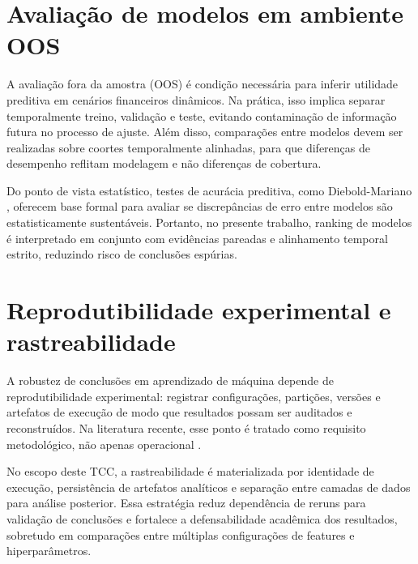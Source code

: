 \section{Avaliação de modelos em ambiente OOS}
A avaliação fora da amostra (OOS) é condição necessária para inferir utilidade preditiva em cenários financeiros dinâmicos. Na prática, isso implica separar temporalmente treino, validação e teste, evitando contaminação de informação futura no processo de ajuste. Além disso, comparações entre modelos devem ser realizadas sobre coortes temporalmente alinhadas, para que diferenças de desempenho reflitam modelagem e não diferenças de cobertura.

Do ponto de vista estatístico, testes de acurácia preditiva, como Diebold-Mariano \cite{DIEBOLDMARIANO1995}, oferecem base formal para avaliar se discrepâncias de erro entre modelos são estatisticamente sustentáveis. Portanto, no presente trabalho, ranking de modelos é interpretado em conjunto com evidências pareadas e alinhamento temporal estrito, reduzindo risco de conclusões espúrias.

\section{Reprodutibilidade experimental e rastreabilidade}
A robustez de conclusões em aprendizado de máquina depende de reprodutibilidade experimental: registrar configurações, partições, versões e artefatos de execução de modo que resultados possam ser auditados e reconstruídos. Na literatura recente, esse ponto é tratado como requisito metodológico, não apenas operacional \cite{PINEAU2021REPRODUCIBILITY}.

No escopo deste TCC, a rastreabilidade é materializada por identidade de execução, persistência de artefatos analíticos e separação entre camadas de dados para análise posterior. Essa estratégia reduz dependência de reruns para validação de conclusões e fortalece a defensabilidade acadêmica dos resultados, sobretudo em comparações entre múltiplas configurações de features e hiperparâmetros.
